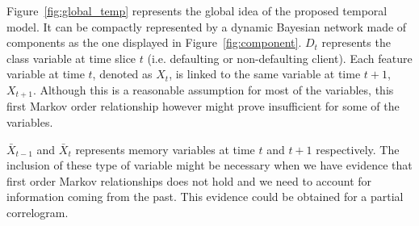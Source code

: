 



%  
%  
%  
%  
%  




Figure~\ref{fig:global_temp} represents the global idea of the proposed temporal model. It can be compactly represented by a dynamic Bayesian network made of components as the one displayed in 
Figure~\ref{fig:component}. $D_t$ represents the class variable at time slice $t$ (i.e. defaulting or non-defaulting client). Each feature variable at time $t$, denoted as $X_t$, is linked to the same variable at time $t+1$, $X_{t+1}$. Although this is a reasonable assumption for most of the variables, this first Markov order relationship however might prove insufficient for some of the variables.

$\bar{X}_{t-1}$ and $\bar{X}_{t}$ represents memory variables at time $t$ and $t+1$ respectively. The inclusion of these type of variable might be necessary when we have evidence that first order Markov relationships does not hold and we need to account for information coming from the past. This evidence could be obtained for a partial correlogram.


